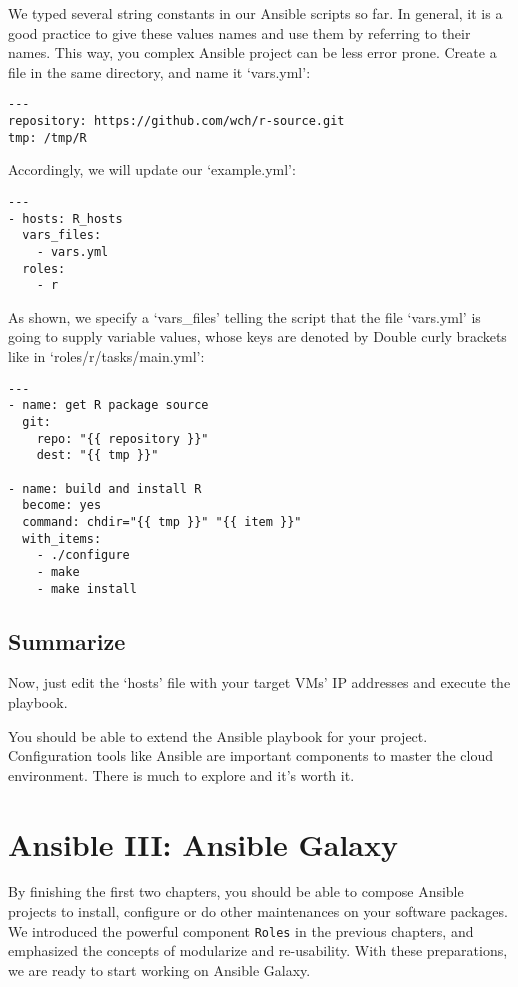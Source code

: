 We typed several string constants in our Ansible scripts so far. In
general, it is a good practice to give these values names and use them
by referring to their names. This way, you complex Ansible project can
be less error prone. Create a file in the same directory, and name it
`vars.yml':

\begin{verbatim}
---
repository: https://github.com/wch/r-source.git
tmp: /tmp/R
\end{verbatim}

Accordingly, we will update our `example.yml':

\begin{verbatim}
---
- hosts: R_hosts
  vars_files:
    - vars.yml
  roles:
    - r
\end{verbatim}

As shown, we specify a `vars\_files' telling the script that the file
`vars.yml' is going to supply variable values, whose keys are denoted by
Double curly brackets like in `roles/r/tasks/main.yml':

\begin{verbatim}
---
- name: get R package source
  git:
    repo: "{{ repository }}"
    dest: "{{ tmp }}"

- name: build and install R
  become: yes
  command: chdir="{{ tmp }}" "{{ item }}"
  with_items:
    - ./configure
    - make
    - make install
\end{verbatim}

\subsection{Summarize}\label{summarize}

Now, just edit the `hosts' file with your target VMs' IP addresses and
execute the playbook.

You should be able to extend the Ansible playbook for your project.
Configuration tools like Ansible are important components to master the
cloud environment. There is much to explore and it's worth it.
\section{Ansible III: Ansible Galaxy}\label{ansible-iii-ansible-galaxy}

By finishing the first two chapters, you should be able to compose
Ansible projects to install, configure or do other maintenances on your
software packages. We introduced the powerful component \texttt{Roles}
in the previous chapters, and emphasized the concepts of modularize and
re-usability. With these preparations, we are ready to start working on
Ansible Galaxy.

